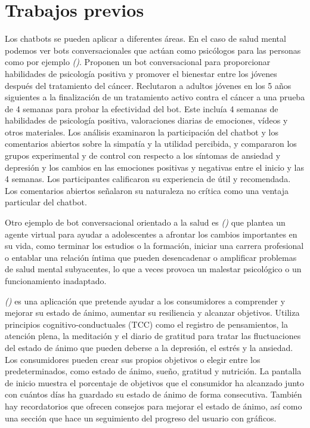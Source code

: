 {{{\section{Trabajos previos}

Los chatbots se pueden aplicar a diferentes áreas. En el caso de salud mental podemos ver bots conversacionales que actúan como psicólogos para las personas como por ejemplo \textit{(\cite{vivibot2019})}. Proponen un bot conversacional para proporcionar habilidades de psicología positiva y promover el bienestar entre los jóvenes después del tratamiento del cáncer. Reclutaron a adultos jóvenes en los 5 años siguientes a la finalización de un tratamiento activo contra el cáncer a una prueba de 4 semanas para probar la efectividad del bot. Este incluía 4 semanas de habilidades de psicología positiva, valoraciones diarias de emociones, vídeos y otros materiales. Los análisis examinaron la participación del chatbot y los comentarios abiertos sobre la simpatía y la utilidad percibida, y compararon los grupos experimental y de control con respecto a los síntomas de ansiedad y depresión y los cambios en las emociones positivas y negativas entre el inicio y las 4 semanas. Los participantes calificaron su experiencia de útil y recomendada. Los comentarios abiertos señalaron su naturaleza no crítica como una ventaja particular del chatbot.\vspace{0.3cm}

Otro ejemplo de bot conversacional orientado a la salud es \textit{(\cite{21daystressdetox2021})} que plantea un agente virtual para ayudar a adolescentes a afrontar los cambios importantes en su vida, como terminar los estudios o la formación, iniciar una carrera profesional o entablar una relación íntima que pueden desencadenar o amplificar problemas de salud mental subyacentes, lo que a veces provoca un malestar psicológico o un funcionamiento inadaptado. \vspace{0.3cm}

\textit{(\cite{moodfit2016})} es una aplicación que pretende ayudar a los consumidores a comprender y mejorar su estado de ánimo, aumentar su resiliencia y alcanzar objetivos. Utiliza principios cognitivo-conductuales (TCC) como el registro de pensamientos, la atención plena, la meditación y el diario de gratitud para tratar las fluctuaciones del estado de ánimo que pueden deberse a la depresión, el estrés y la ansiedad. Los consumidores pueden crear sus propios objetivos o elegir entre los predeterminados, como estado de ánimo, sueño, gratitud y nutrición. La pantalla de inicio muestra el porcentaje de objetivos que el consumidor ha alcanzado junto con cuántos días ha guardado su estado de ánimo de forma consecutiva. También hay recordatorios que ofrecen consejos para mejorar el estado de ánimo, así como una sección que hace un seguimiento del progreso del usuario con gráficos.


}}}
